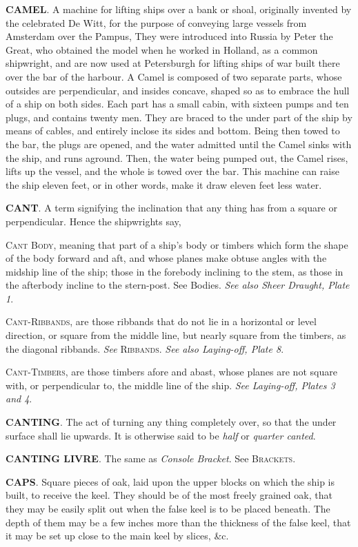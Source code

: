 \textbf{CAMEL}. A machine for lifting ships over a bank or shoal, originally invented by the celebrated De Witt, for the purpose of conveying large vessels from Amsterdam over the Pampus, They were introduced into Russia by Peter the Great, who obtained the model when he worked in Holland, as a common shipwright, and are now used at Petersburgh for lifting ships of war built there over the bar of the harbour. A Camel is composed of two separate parts, whose outsides are perpendicular, and insides concave, shaped so as to embrace the hull of a ship on both sides. Each part has a small cabin, with sixteen pumps and ten plugs, and contains twenty men. They are braced to the under part of the ship by means of cables, and entirely inclose its sides and bottom. Being then towed to the bar, the plugs are opened, and the water admitted until the Camel sinks with the ship, and runs aground. Then, the water being pumped out, the Camel rises, lifts up the vessel, and the whole is towed over the bar. This machine can raise the ship eleven feet, or in other words, make it draw eleven feet less water. 

\textbf{CANT}. A term signifying the inclination that any thing has from a square or perpendicular. Hence the shipwrights say, 

\textsc{Cant Body}, meaning that part of a ship's body or timbers which form the shape of the body forward and aft, and whose planes make obtuse angles with the midship line of the ship; those in the forebody inclining to the stem, as those in the afterbody incline to the stern-post. See Bodies. \textit{See also Sheer Draught, Plate 1}. 

\textsc{Cant-Ribbands}, are those ribbands that do not lie in a horizontal or level direction, or square from the middle line, but nearly square from the timbers, as the diagonal ribbands. \textit{See} \textsc{Ribbands}. \textit{See also Laying-off, Plate 8}. 

\textsc{Cant-Timbers}, are those timbers afore and abast, whose planes are not square with, or perpendicular to, the middle line of the ship. \textit{See Laying-off, Plates 3 and 4}. 

\textbf{CANTING}. The act of turning any thing completely over, so that the under surface shall lie upwards. It is otherwise said to be \textit{half} or \textit{quarter canted}.

\textbf{CANTING LIVRE}. The same as \textit{Console Bracket}. See \textsc{Brackets}. 

\textbf{CAPS}. Square pieces of oak, laid upon the upper blocks on which the ship is built, to receive the keel. They should be of the most freely grained oak, that they may be easily split out when the false keel is to be placed beneath. The depth of them may be a few inches more than the thickness of the false keel, that it may be set up close to the main keel by slices, \&c.


